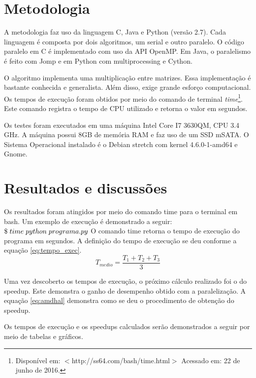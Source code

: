 \documentclass[a4paper,12pt]{article}
\begin{document}
\section{Metodologia}
A metodologia faz uso da linguagem C, Java e Python (versão 2.7). Cada linguagem é composta por dois algoritmos, um serial e outro paralelo. O código paralelo em C é implementado com uso da API OpenMP. Em Java, o paralelismo é feito com Jomp e em Python com multiprocessing e Cython. 

O algoritmo implementa uma multiplicação entre matrizes. Essa implementação é bastante conhecida e generalista. Além disso, exige grande esforço computacional. Os tempos de execução foram obtidos por meio do comando de terminal {\it time}\footnote{Disponível em: $<$http://ss64.com/bash/time.html$>$ Acessado em: 22 de junho de 2016.}. Este comando registra o tempo de CPU utilizado e retorna o valor em segundos.  

Os testes foram executados em uma máquina Intel Core I7 3630QM, CPU 3.4 GHz. A máquina possui 8GB de memória RAM e faz uso de um SSD mSATA. O Sistema Operacional instalado é o Debian stretch com kernel 4.6.0-1-amd64 e Gnome.

\section{Resultados e discussões}
Os resultados foram atingidos por meio do comando time para o terminal em bash. Um exemplo de execução é demonstrado a seguir: 
$\$\hspace{0.1cm} time \hspace{0.1cm} python \hspace{0.1cm}programa.py$
O comando time retorna o tempo de execução do programa em segundos. A definição do tempo de execução se deu conforme a equação \ref{eq:tempo_exec}.
\begin{equation}
  \label{eq:tempo_exec}
   T_{medio} = \frac{T_{1} + T_{2} + T_{3}}{3}
\end{equation}

Uma vez descoberto os tempos de execução, o próximo cálculo realizado foi o do speedup. Este demonstra o ganho de desempenho obtido com a paralelização. A equação \hyperlink{eq:amdhal}{\ref{eq:amdhal}} demonstra como se deu o procedimento de obtenção do speedup.

Os tempos de execução e os speedups calculados serão demonstrados a seguir por meio de tabelas e gráficos. 
\end{document}
